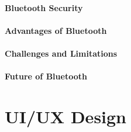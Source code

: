 \subsubsection{Bluetooth Security}
\subsubsection{Advantages of Bluetooth}
\subsubsection{Challenges and Limitations}
\subsubsection{Future of Bluetooth}
\chapter{UI/UX Design}